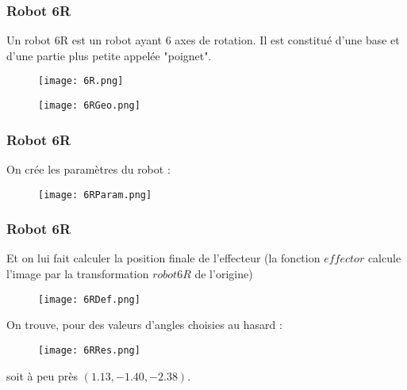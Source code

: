 \documentclass{beamer}
\begin{document}
%
%

\begin{frame}
\frametitle{Robot 6R}
Un robot 6R est un robot ayant 6 axes de rotation. Il est constitué d'une base et d'une partie plus petite appelée "poignet".

\begin{figure}[!ht]
    \begin{minipage}[c]{.46\linewidth}
        \centering
        \texttt{[image: 6R.png]}
    \end{minipage}
    \hfill%
    \begin{minipage}[c]{.46\linewidth}
        \centering
        \texttt{[image: 6RGeo.png]}
    \end{minipage}
\end{figure}

\end{frame}
\begin{frame}
\frametitle{Robot 6R}
On crée les paramètres du robot : 
\begin{figure}[!ht]
\texttt{[image: 6RParam.png]}
\end{figure}

\end{frame}

\begin{frame}
\frametitle{Robot 6R}
Et on lui fait calculer la position finale de l'effecteur (la fonction $effector$ calcule l'image par la transformation $robot6R$ de l'origine) \vspace{-0.4cm}
\begin{figure}[!ht]
\hspace*{-0.7cm}
\texttt{[image: 6RDef.png]}
\end{figure}\vspace{-0.3cm}

On trouve, pour des valeurs d'angles choisies au hasard : 

\begin{figure}[!ht]
\texttt{[image: 6RRes.png]}
\end{figure} soit à peu près $(1.13, −1.40, −2.38)$.
\end{frame}
\end{document}
